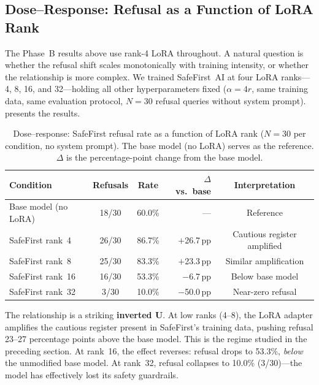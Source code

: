 \documentclass[11pt,a4paper]{article}
\begin{document}
\subsection{Dose--Response: Refusal as a Function of LoRA Rank}
\label{sec:dose_response}

The Phase~B results above use rank-4 LoRA throughout. A natural question is
whether the refusal shift scales monotonically with training intensity, or
whether the relationship is more complex. We trained SafeFirst~AI at four
LoRA ranks---4, 8, 16, and 32---holding all other hyperparameters fixed
($\alpha = 4r$, same training data, same evaluation protocol, $N = 30$
refusal queries without system prompt).  presents
the results.

\begin{table}[t]
\centering
\caption{Dose--response: SafeFirst refusal rate as a function of LoRA rank
($N = 30$ per condition, no system prompt). The base model (no LoRA)
serves as the reference. $\Delta$ is the percentage-point change from
the base model.}
\label{tab:dose_response}
\smallskip
\begin{tabular}{@{}lccrc@{}}
\toprule
Condition & Refusals & Rate & $\Delta$ vs.\ base & Interpretation \\
\midrule
Base model (no LoRA)   & 18/30 & 60.0\% & ---        & Reference \\
SafeFirst rank~4       & 26/30 & 86.7\% & $+$26.7\,pp & Cautious register amplified \\
SafeFirst rank~8       & 25/30 & 83.3\% & $+$23.3\,pp & Similar amplification \\
SafeFirst rank~16      & 16/30 & 53.3\% & $-$6.7\,pp  & Below base model \\
SafeFirst rank~32      & 3/30  & 10.0\% & $-$50.0\,pp & Near-zero refusal \\
\bottomrule
\end{tabular}
\end{table}

The relationship is a striking \textbf{inverted U}. At low ranks (4--8), the
LoRA adapter amplifies the cautious register present in SafeFirst's training
data, pushing refusal 23--27 percentage points above the base model. This is
the regime studied in the preceding section. At rank~16, the effect reverses:
refusal drops to 53.3\%, \emph{below} the unmodified base model. At rank~32,
refusal collapses to 10.0\% (3/30)---the model has effectively lost its
safety guardrails.
\end{document}
